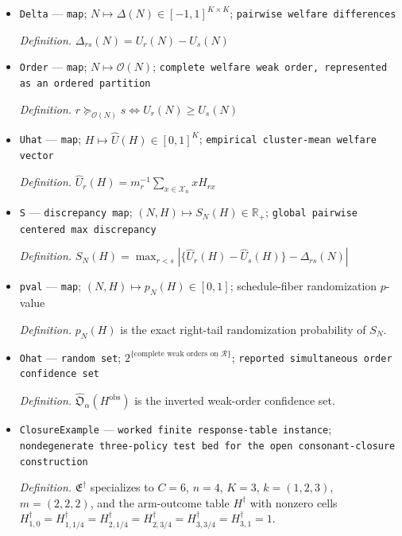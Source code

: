 \documentclass{article}
\begin{document}
\begin{itemize}
  \par\smallskip\noindent\emph{Definition.} \(U_r(N)=C^{-1}\sum_{t\in\mathcal T}N_tu_{tr}\)
  \item \texttt{Delta} --- \texttt{map}; \(N\mapsto\Delta(N)\in[-1,1]^{K\times K}\); \texttt{pairwise welfare differences}
  \par\smallskip\noindent\emph{Definition.} \(\Delta_{rs}(N)=U_r(N)-U_s(N)\)
  \item \texttt{Order} --- \texttt{map}; \(N\mapsto\mathcal O(N)\); \texttt{complete welfare weak order,\allowbreak{} represented as an ordered partition}
  \par\smallskip\noindent\emph{Definition.} \(r\succeq_{\mathcal O(N)}s\Longleftrightarrow U_r(N)\ge U_s(N)\)
  \item \texttt{Uhat} --- \texttt{map}; \(H\mapsto\widehat U(H)\in[0,1]^K\); \texttt{empirical cluster-\allowbreak{}mean welfare vector}
  \par\smallskip\noindent\emph{Definition.} \(\widehat U_r(H)=m_r^{-1}\sum_{x\in\mathcal X_n}xH_{rx}\)
  \item \texttt{S} --- \texttt{discrepancy map}; \((N,H)\mapsto S_N(H)\in\mathbb R_+\); \texttt{global pairwise centered max discrepancy}
  \par\smallskip\noindent\emph{Definition.} \(S_N(H)=\max_{r<s}|\{\widehat U_r(H)-\widehat U_s(H)\}-\Delta_{rs}(N)|\)
  \item \texttt{pval} --- \texttt{map}; \((N,H)\mapsto p_N(H)\in[0,1]\); schedule-fiber randomization \(p\)-value
  \par\smallskip\noindent\emph{Definition.} \(p_N(H)\) is the exact right-tail randomization probability of \(S_N\).
  \item \texttt{Ohat} --- \texttt{random set}; \(2^{\{\text{complete weak orders on }\mathcal R\}}\); \texttt{reported simultaneous order confidence set}
  \par\smallskip\noindent\emph{Definition.} \(\widehat{\mathfrak O}_{\alpha}(H^{\mathrm{obs}})\) is the inverted weak-order confidence set.
  \item \texttt{ClosureExample} --- \texttt{worked finite response-\allowbreak{}table instance}; \texttt{nondegenerate three-\allowbreak{}policy test bed for the open consonant-\allowbreak{}closure construction}
  \par\smallskip\noindent\emph{Definition.} \(\mathfrak E^\dagger\) specializes to \(C=6\), \(n=4\), \(K=3\), \(k=(1,2,3)\), \(m=(2,2,2)\), and the arm-outcome table \(H^\dagger\) with nonzero cells \(H^\dagger_{1,0}=H^\dagger_{1,1/4}=H^\dagger_{2,1/4}=H^\dagger_{2,3/4}=H^\dagger_{3,3/4}=H^\dagger_{3,1}=1\).

\end{itemize}
\end{document}
